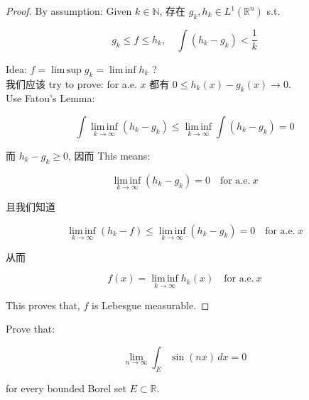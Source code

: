\begin{proof}

By assumption: Given \(k \in \mathbb{N}\), 存在 \(g_{k},h_{k} \in L^{1}(\mathbb{R}^{n})\) s.t.

\[g_{k} \leq f \leq h_{k},\quad\int(h_{k} - g_{k}) < \frac{1}{k}\]

Idea: \(f = \operatorname{lim\, sup}g_{k} = \operatorname{lim\, inf}h_{k}\) ?\\
我们应该 try to prove: for a.e. \(x\) 都有 \(0 \leq h_{k}(x) - g_{k}(x)\rightarrow 0\).\\
Use Fatou's Lemma:

\[\int\operatorname{lim\, inf}\limits_{k\rightarrow\infty}(h_{k} - g_{k}) \leq \operatorname{lim\, inf}\limits_{k\rightarrow\infty}\int(h_{k} - g_{k}) = 0\]

而 \(h_{k} - g_{k} \geq 0\), 因而 This means:

\[\operatorname{lim\, inf}\limits_{k\rightarrow\infty}(h_{k} - g_{k}) = 0\quad\text{for a.e.}\ x\]

且我们知道

\[\operatorname{lim\, inf}\limits_{k\rightarrow\infty}(h_{k} - f) \leq \operatorname{lim\, inf}\limits_{k\rightarrow\infty}(h_{k} - g_{k}) = 0\quad\text{for a.e.}\ x\]

从而

\[f(x) = \operatorname{lim\, inf}\limits_{k\rightarrow\infty}h_{k}(x)\quad\text{for a.e.}\ x\]

This proves that, \(f\) is Lebesgue measurable.

\end{proof}

\begin{example}

Prove that:

\[\lim\limits_{n\rightarrow\infty}\int_{E}\sin(nx)\, dx = 0\]

for every bounded Borel set \(E \subset \mathbb{R}\).\\

\end{example}

